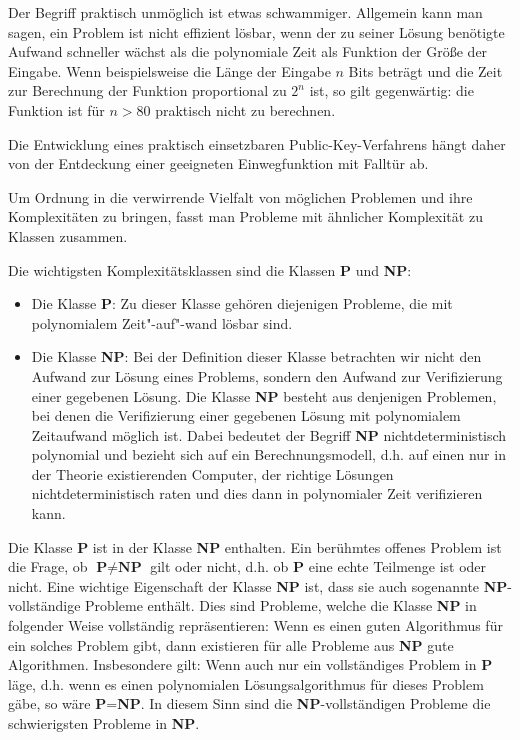 \begin{refsegment}
Der Begriff \glqq praktisch unmöglich\grqq {} ist etwas schwammiger.
Allgemein kann man sagen, ein Problem ist 
nicht effizient lösbar, wenn der zu seiner Lösung benötigte Aufwand
schneller wächst als die polynomiale  Zeit als Funktion der Größe der
Eingabe. Wenn beispielsweise die Länge der Eingabe $ n $  Bits beträgt
und die Zeit zur Berechnung der Funktion proportional zu $ 2^n $ ist,
so gilt gegenwärtig: die Funktion ist für $n > 80$ praktisch nicht zu
berechnen.

Die Entwicklung eines praktisch einsetzbaren Public-Key-Verfahrens hängt daher von der Entdeckung einer geeigneten Einwegfunktion mit Falltür ab.\par

Um Ordnung in die verwirrende Vielfalt von möglichen Problemen und ihre Komplexitäten zu bringen, fasst man Probleme mit ähnlicher Komplexität zu Klassen zusammen.

Die wichtigsten Komplexitätsklassen  sind die Klassen \textbf{P} und \textbf{NP}:

\begin{itemize}
    \item Die Klasse \textbf{P}: Zu dieser Klasse gehören diejenigen Probleme, die mit polynomialem  Zeit"-auf"-wand lösbar sind.

    \item Die Klasse \textbf{NP}: Bei der Definition dieser Klasse betrachten wir nicht den Aufwand zur Lösung eines Problems, sondern den Aufwand zur Verifizierung einer gegebenen Lösung. Die Klasse \textbf{NP} besteht aus denjenigen Problemen, bei denen die Verifizierung einer gegebenen Lösung mit polynomialem Zeitaufwand möglich ist. Dabei bedeutet der Begriff \textbf{NP} \glqq nichtdeterministisch\grqq {} polynomial  und bezieht sich auf ein Berechnungsmodell, d.h. auf einen nur in der Theorie existierenden Computer, der richtige Lösungen nichtdeterministisch \glqq raten\grqq {} und dies dann in polynomialer Zeit verifizieren kann.
\end{itemize}

Die Klasse \textbf{P} ist in der Klasse \textbf{NP} enthalten. Ein berühmtes offenes Problem ist die Frage, ob $ \textbf{P} \neq \textbf{NP} $ gilt oder nicht, d.h. ob \textbf{P} eine echte Teilmenge ist oder nicht. Eine wichtige Eigenschaft der Klasse \textbf{NP} ist, dass sie auch sogenannte \textbf{NP}-vollständige{} Probleme enthält. Dies sind Probleme, welche die Klasse \textbf{NP} in folgender Weise vollständig repräsentieren: Wenn es einen \glqq guten\grqq {} Algorithmus für ein solches Problem gibt, dann existieren für alle Probleme aus \textbf{NP} \glqq gute\grqq {} Algorithmen. Insbesondere gilt: Wenn auch nur ein vollständiges Problem in \textbf{P} läge, d.h. wenn es einen polynomialen  Lösungsalgorithmus für dieses Problem gäbe, so wäre \textbf{P}=\textbf{NP}. In diesem Sinn sind die \textbf{NP}-vollständigen Probleme die schwierigsten Probleme in \textbf{NP}.


\end{refsegment}
